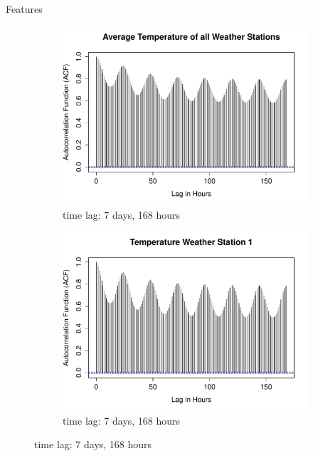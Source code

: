 \documentclass{beamer}
\begin{document}
\begin{frame}{Features}
\begin{figure}[!ht]
\centering
\begin{subfigure}[b]{.4\linewidth}
\includegraphics[width=\linewidth]{../report/gfx/acf_avg_temp_7days.pdf}
\caption{time lag: 7 days, 168 hours}
\label{subfig:avg-temp-7days}
\end{subfigure}
\begin{subfigure}[b]{.4\linewidth}
\includegraphics[width=\linewidth]{../report/gfx/acf_temp_station1_7days.pdf}
\caption{time lag: 7 days, 168 hours}
\label{subfig:temp-station1-7days}
\end{subfigure}


\end{figure}
\end{frame}
\end{document}
